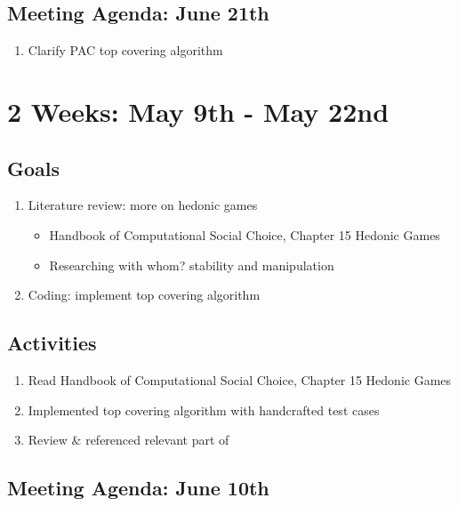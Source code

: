 \documentclass[a4paper]{article}
\begin{document}
\subsection*{Meeting Agenda: June 21th}

\begin{enumerate}
  \item Clarify PAC top covering algorithm
\end{enumerate}

\section*{2 Weeks: May 9th - May 22nd}

\subsection*{Goals}

\begin{enumerate}
  \item Literature review: more on hedonic games
  \begin{itemize}
    \item Handbook of Computational Social Choice, Chapter 15 Hedonic Games \cite{aziz_savani_moulin_2016}
    \item Researching with whom? stability and manipulation \cite{ALCALDE2004869}
  \end{itemize}

  \item Coding: implement top covering algorithm

\end{enumerate}

\subsection*{Activities}

\begin{enumerate}
  \item Read Handbook of Computational Social Choice, Chapter 15 Hedonic Games \cite{aziz_savani_moulin_2016}
  \item Implemented top covering algorithm with handcrafted test cases
  \item Review \& referenced relevant part of \cite{ALCALDE2004869}
\end{enumerate}

\subsection*{Meeting Agenda: June 10th}
\end{document}
